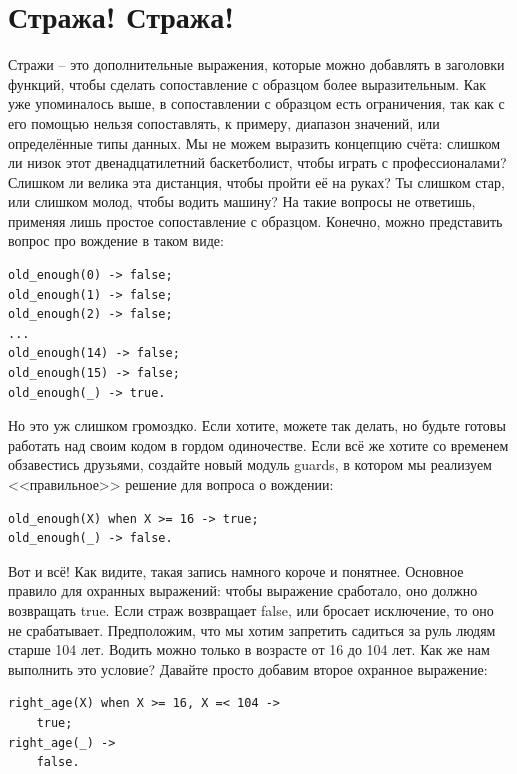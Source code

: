 \documentclass[a4paper,12pt]{report}
\newcommand{\ops}{\colorbox{lgreen}}
\begin{document}
\section{Стража! Стража!}
    Стражи \--- это дополнительные выражения, которые можно добавлять в заголовки функций, чтобы сделать сопоставление с образцом более выразительным. Как уже упоминалось выше, в сопоставлении с образцом есть ограничения, так как с его помощью нельзя сопоставлять, к примеру, диапазон значений, или  определённые типы данных. Мы не можем выразить концепцию счёта: слишком ли низок этот двенадцатилетний баскетболист, чтобы играть с профессионалами? Слишком ли велика эта дистанция, чтобы пройти её на руках? Ты слишком стар, или слишком молод, чтобы водить машину? На такие вопросы не ответишь, применяя лишь простое сопоставление с образцом. Конечно, можно представить вопрос про вождение в таком виде:
\begin{lstlisting}[style=erlang]
old_enough(0) -> false;
old_enough(1) -> false;
old_enough(2) -> false;
...
old_enough(14) -> false;
old_enough(15) -> false;
old_enough(_) -> true.
\end{lstlisting}

Но это уж слишком громоздко. Если хотите, можете так делать, но будьте готовы работать над своим кодом в гордом одиночестве. Если всё же хотите со временем обзавестись друзьями, создайте новый модуль \ops{guards}, в котором мы реализуем <<правильное>> решение для вопроса о вождении:
\begin{lstlisting}[style=erlang]
old_enough(X) when X >= 16 -> true;
old_enough(_) -> false.
\end{lstlisting}

Вот и всё! Как видите, такая запись намного короче и понятнее. Основное правило для охранных выражений: чтобы выражение сработало, оно должно возвращать \ops{true}. Если страж возвращает \ops{false}, или бросает исключение, то оно не срабатывает. Предположим, что мы хотим запретить садиться за руль людям старше 104 лет. Водить можно только в возрасте от 16 до 104 лет. Как же нам выполнить это условие? Давайте просто добавим второе охранное выражение:
\begin{lstlisting}[style=erlang]
right_age(X) when X >= 16, X =< 104 ->
    true;
right_age(_) ->
    false.
\end{lstlisting}
\end{document}
